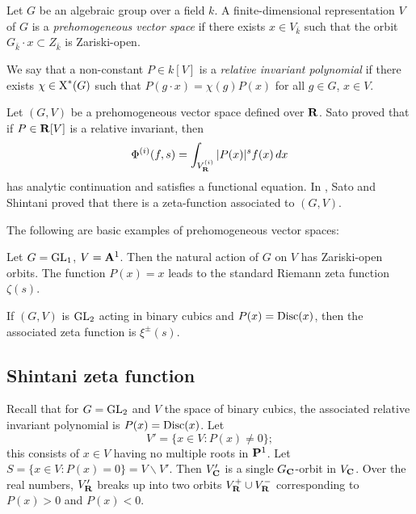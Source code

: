 \begin{defi}[Sato] %
Let $G$ be an algebraic group over a field $k$. A finite-dimensional 
representation $V$ of $G$ is a \emph{prehomogeneous vector space} if 
there exists $x\in V_{\bar k}$ such that the orbit 
$G_{\bar k}\cdot x\subset Z_{\bar k}$ is Zariski-open. 
\end{defi}

We say that a non-constant $P\in k[V]$ is a \emph{relative invariant 
polynomial} if there exists $\chi\in \operatorname{X}^\ast(G)$ such that 
$P(g\cdot x) = \chi(g) P(x)$ for all $g\in G$, $x\in V$. 

Let $(G,V)$ be a prehomogeneous vector space defined over $\mathbf{R}$. Sato proved 
that if $P\in \mathbf{R}[V]$ is a relative invariant, then 
\[
  \Phi^{(i)}(f,s) = \int_{V_{\mathbf{R}}^{(i)}} |P(x)|^s f(x)\, dx
\]
has analytic continuation and satisfies a functional equation. In \cite{ss74}, 
Sato and Shintani proved that there is a zeta-function associated to $(G,V)$. 

The following are basic examples of prehomogeneous vector spaces: 

\begin{example}
Let $G=\operatorname{GL}_1$, $V=\mathbf{A}^1$. Then the natural action of $G$ on $V$ 
has Zariski-open orbits. The function $P(x)=x$ leads to the standard Riemann 
zeta function $\zeta(s)$. 
\end{example}

\begin{example}
If $(G,V)$ is $\operatorname{GL}_2$ acting in binary cubics and 
$P(x)=\operatorname{Disc}(x)$, then the associated zeta function is 
$\xi^\pm(s)$. 
\end{example}





\subsection{Shintani zeta function}

Recall that for $G=\operatorname{GL}_2$ and $V$ the space of binary cubics, 
the associated relative invariant polynomial is $P(x)=\operatorname{Disc}(x)$. Let 
\[
  V' = \{x\in V:P(x)\ne 0\} ;
\]
this consists of $x\in V$ having no multiple roots in $\mathbf{P}^1$. Let 
$S=\{x\in V:P(x)=0\} = V\smallsetminus V'$. Then $V_{\mathbf{C}}'$ is a single 
$G_{\mathbf{C}}$-orbit in $V_{\mathbf{C}}$. Over the real numbers, $V_{\mathbf{R}}'$ breaks up into two 
orbits $V_{\mathbf{R}}^+\cup V_{\mathbf{R}}^-$ corresponding to $P(x)>0$ and $P(x)<0$. 

